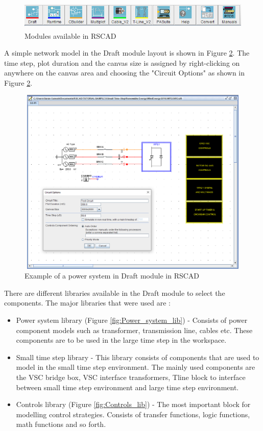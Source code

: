 \begin{figure}[H]
\centering
    \includegraphics[height = 1.4cm,width = 14.5cm]{Diagrams/Chapter_3/RSCAD_modules.PNG}
    \caption{Modules available in RSCAD}
    \label{fig:RSCAD_modules}
\end{figure}

A simple network model in the Draft module layout is shown in Figure \ref{fig:Dft_RSCAD}. The time step, plot duration and the canvas size is assigned by right-clicking on anywhere on the canvas area and choosing the "Circuit Options" as shown in Figure \ref{fig:Dft_RSCAD}.

\begin{figure}[H]
\centering
    \includegraphics[height = 9cm,width = 11.5cm]{Diagrams/Chapter_3/Dft_RSCAD.PNG}
    \caption{Example of a power system in Draft module in RSCAD}
    \label{fig:Dft_RSCAD}
\end{figure}

There are different libraries available in the Draft module to select the components. The major libraries that were used are \cite{rtds_tech}:
\begin{itemize}\label{Library_RSCAD}
    \item Power system library (Figure \ref{fig:Power_system_lib}) - Consists of power component models such as transformer, transmission line, cables etc. These components are to be used in the large time step in the workspace. 
    \item Small time step library - This library consists of components that are used to model in the small time step environment. The mainly used components are the \gls{VSC} bridge box, \gls{VSC} interface transformers, Tline block to interface between small time step environment and large time step environment.    
    \item Controls library (Figure \ref{fig:Controls_lib}) - The most important block for modelling control strategies. Consists of transfer functions, logic functions, math functions and so forth.
\end{itemize}

